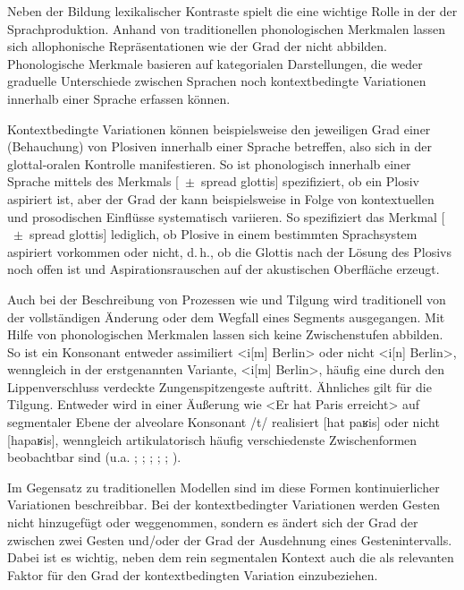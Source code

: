 Neben der Bildung lexikalischer Kontraste spielt die  eine wichtige Rolle in der  der Sprachproduktion. Anhand von traditionellen phonologischen Merkmalen lassen sich allophonische Repräsentationen wie der Grad der  nicht abbilden. Phonologische Merkmale basieren auf kategorialen Darstellungen, die weder graduelle Unterschiede zwischen Sprachen noch kontextbedingte Variationen innerhalb einer Sprache erfassen können. 

  
Kontextbedingte Variationen können beispielsweise den jeweiligen Grad einer  (Behauchung) von Plosiven innerhalb einer Sprache betreffen, also sich in der glottal-oralen Kontrolle manifestieren. So ist phonologisch innerhalb einer Sprache mittels des Merkmals [${\;\pm\;}$spread glottis] spezifiziert, ob ein Plosiv aspiriert ist, aber der Grad der  kann beispielsweise in Folge von kontextuellen und prosodischen Einflüsse systematisch variieren. So spezifiziert das Merkmal [${\;\pm\;}$spread glottis] lediglich, ob Plosive in einem bestimmten Sprachsystem aspiriert vorkommen oder nicht, d.\,h., ob die Glottis nach der Lösung des Plosivs noch offen ist und Aspirationsrauschen auf der akustischen Oberfläche erzeugt. 

Auch bei der Beschreibung von Prozessen wie  und Tilgung wird traditionell von der vollständigen Änderung oder dem Wegfall eines Segments ausgegangen. Mit Hilfe von phonologischen Merkmalen lassen sich keine Zwischenstufen abbilden. So ist ein Konsonant entweder assimiliert <i[m] Berlin> oder nicht <i[n] Berlin>, wenngleich in der erstgenannten Variante, <i[m] Berlin>, häufig eine durch den Lippenverschluss verdeckte Zungenspitzengeste auftritt. Ähnliches gilt für die Tilgung. Entweder wird in einer Äußerung wie <Er hat Paris erreicht> auf segmentaler Ebene der alveolare Konsonant /t/ realisiert [hat paʁis] oder nicht [hapaʁis], wenngleich artikulatorisch häufig verschiedenste Zwischenformen beobachtbar sind (u.a. \citealt{Barry1991}; \citealt{Kohler1995}; \citealt{Ellis2002}; \citealt{Jaeger2007}; \citealt{Mücke2008c}; \citealt{Bergmann2008}). 

Im Gegensatz zu traditionellen Modellen sind im  diese Formen kontinuierlicher Variationen beschreibbar. Bei der  kontextbedingter Variationen werden Gesten nicht hinzugefügt oder weggenommen, sondern es ändert sich der Grad der  zwischen zwei Gesten und/oder der Grad der Ausdehnung eines Gestenintervalls. Dabei ist es wichtig, neben dem rein segmentalen Kontext auch die  als relevanten Faktor für den Grad der kontextbedingten Variation einzubeziehen.

